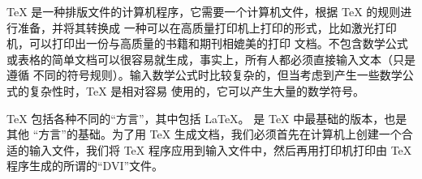 %
%
%
%
%
%



\TeX{} 是一种排版文件的计算机程序，它需要一个计算机文件，根据 \TeX{} 的规则进行准备，并将其转换成
一种可以在高质量打印机上打印的形式，比如激光打印机，可以打印出一份与高质量的书籍和期刊相媲美的打印
文档。不包含数学公式或表格的简单文档可以很容易就生成，事实上，所有人都必须直接输入文本（只是遵循
不同的符号规则）。输入数学公式时比较复杂的，但当考虑到产生一些数学公式的复杂性时，\TeX{} 是相对容易
使用的，它可以产生大量的数学符号。

\TeX{} 包括各种不同的“方言”，其中包括 \LaTeX{}。\PlainTeX{} 是 \TeX{} 中最基础的版本，也是其他
“方言”的基础。为了用 \TeX{} 生成文档，我们必须首先在计算机上创建一个合适的输入文件，我们将 \TeX{}
程序应用到输入文件中，然后再用打印机打印由 \TeX{} 程序生成的所谓的“DVI”文件。

